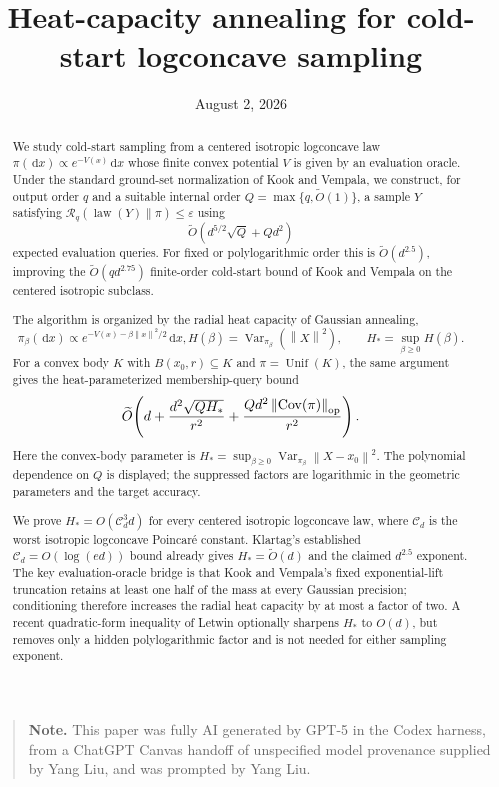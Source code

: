 \documentclass[11pt]{article}
\title{Heat-capacity annealing for cold-start logconcave sampling}
\author{}
\date{August 2, 2026}
\theoremstyle{remark}
\newcommand{\1}{\bm 1}
\newcommand{\eps}{\varepsilon}
\newcommand{\Cov}{\operatorname{Cov}}
\newcommand{\Var}{\operatorname{Var}}
\newcommand{\law}{\operatorname{law}}
\newcommand{\dd}{\,\mathrm d}
\newcommand{\wtO}{\widetilde O}
\newcommand{\norm}[1]{\left\lVert #1\right\rVert}
\begin{document}
\maketitle

\begin{abstract}
We study cold-start sampling from a centered isotropic logconcave law
$\pi(\dd x)\propto e^{-V(x)}\dd x$ whose finite convex potential $V$ is
given by an evaluation oracle.  Under the standard ground-set
normalization of Kook and Vempala, we construct,
for output order $q$ and a suitable internal order
$Q=\max\{q,\widetilde O(1)\}$, a sample $Y$ satisfying
$\mathcal R_q(\law(Y)\|\pi)\leq\eps$ using
\[
  \widetilde O\!\left(d^{5/2}\sqrt Q+Qd^2\right)
\]
expected evaluation queries.  For fixed or polylogarithmic order this is
$\widetilde O(d^{2.5})$, improving the
$\widetilde O(qd^{2.75})$ finite-order cold-start bound of Kook and
Vempala on the centered isotropic subclass.

The algorithm is organized by the radial heat capacity of Gaussian
annealing,
\[
  \pi_\beta(\dd x)\propto
  e^{-V(x)-\beta\norm x^2/2}\dd x,
  H(\beta)=\Var_{\pi_\beta}\!\left(\norm X^2\right),
  \qquad H_* = \sup_{\beta\geq0}H(\beta).
\]
For a convex body $K$ with $B(x_0,r)\subseteq K$ and
$\pi=\operatorname{Unif}(K)$, the same argument gives the
heat-parameterized membership-query bound
  \[
  \wtO\!\left(
    d+\frac{d^2\sqrt{QH_*}}{r^2}
    +\frac{Qd^2\norm{\Cov(\pi)}_{\rm op}}{r^2}
  \right).
\]
Here the convex-body parameter is
$H_*=\sup_{\beta\geq0}\Var_{\pi_\beta}\norm{X-x_0}^2$.
The polynomial dependence on $Q$ is displayed; the suppressed factors
are logarithmic in the geometric parameters and the target accuracy.

We prove $H_*=O(\mathcal C_d^3d)$ for every centered isotropic
logconcave law, where $\mathcal C_d$ is the worst isotropic logconcave
Poincar\'e constant.  Klartag's established
$\mathcal C_d=O(\log(ed))$ bound already gives
$H_*=\widetilde O(d)$ and the claimed $d^{2.5}$ exponent.  The key
evaluation-oracle bridge is that Kook and Vempala's fixed exponential-lift
truncation retains at least one half of the mass at every Gaussian
precision; conditioning therefore increases the radial heat capacity by
at most a factor of two.  A recent quadratic-form inequality of Letwin
optionally sharpens $H_*$ to $O(d)$, but removes only a hidden
polylogarithmic factor and is not needed for either sampling exponent.
\end{abstract}

\begin{quote}
\small\noindent\textbf{Note.} This paper was fully AI generated by GPT-5
in the Codex harness, from a ChatGPT Canvas handoff of unspecified model
provenance supplied by Yang Liu, and was prompted by Yang Liu.
\end{quote}
\end{document}
